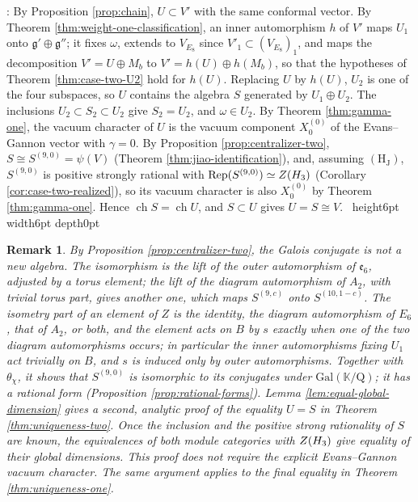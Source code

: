\documentclass[leqno]{article}
\newcommand{\K}{\ensuremath{\mathbb{K}}}
\newcommand{\Q}{\mathrm{Q}}
\let\cal\relax
\newcommand{\cal}{\mathcal}
\newcommand{\qed}{\hfill \vrule height6pt  width6pt depth0pt}
\DeclareMathOperator{\Rep}{Rep}
\newtheorem{remark}[thm]{Remark}
\newenvironment{proof}[1][]{\noindent {\it Proof #1} : }{\hbox{~}\qed
\smallskip
}
\numberwithin{equation}{section}
\begin{document}
\begin{proof}
By Proposition \ref{prop:chain}, $U \subset V'$ with the same conformal vector. By Theorem \ref{thm:weight-one-classification}, an inner automorphism $h$ of $V'$ maps $U_1$ onto $\mathfrak g' \oplus \mathfrak g''$; it fixes $\omega$, extends to $V_{E_8}$ since $V'_1 \subset (V_{E_8})_1$, and maps the decomposition $V' = U \oplus M_b$ to $V' = h(U) \oplus h(M_b)$, so that the hypotheses of Theorem \ref{thm:case-two-U2} hold for $h(U)$. Replacing $U$ by $h(U)$, $U_2$ is one of the four subspaces, so $U$ contains the algebra $S$ generated by $U_1 \oplus U_2$. The inclusions $U_2 \subset S_2 \subset U_2$ give $S_2 = U_2$, and $\omega \in U_2$. By Theorem \ref{thm:gamma-one}, the vacuum character of $U$ is the vacuum component $X^{(0)}_0$ of the Evans--Gannon vector with $\gamma = 0$. By Proposition \ref{prop:centralizer-two}, $S \cong S^{(9,0)} = \psi(V)$ (Theorem \ref{thm:jiao-identification}), and, assuming $\mathrm{(H_J)}$, $S^{(9,0)}$ is positive strongly rational with $\Rep(S^{(9,0)}) \simeq Z(\cal H_3)$ (Corollary \ref{cor:case-two-realized}), so its vacuum character is also $X^{(0)}_0$ by Theorem \ref{thm:gamma-one}. Hence $\operatorname{ch}S = \operatorname{ch}U$, and $S \subset U$ gives $U = S \cong V$.
\end{proof}

\begin{remark}\normalfont
\label{rem:twin}
By Proposition \ref{prop:centralizer-two}, the Galois conjugate is not a new algebra. The isomorphism is the lift of the outer automorphism of $\mathfrak e_6$, adjusted by a torus element; the lift of the diagram automorphism of $A_2$, with trivial torus part, gives another one, which maps $S^{(9,c)}$ onto $S^{(10,1-c)}$. The isometry part of an element of $Z$ is the identity, the diagram automorphism of $E_6$, that of $A_2$, or both, and the element acts on $B$ by $s$ exactly when one of the two diagram automorphisms occurs; in particular the inner automorphisms fixing $U_1$ act trivially on $B$, and $s$ is induced only by outer automorphisms. Together with $\theta_\chi$, it shows that $S^{(9,0)}$ is isomorphic to its conjugates under $\mathrm{Gal}(\K/\Q)$; it has a rational form (Proposition \ref{prop:rational-forms}). Lemma \ref{lem:equal-global-dimension} gives a second, analytic proof of the equality $U = S$ in Theorem \ref{thm:uniqueness-two}. Once the inclusion and the positive strong rationality of $S$ are known, the equivalences of both module categories with $Z(\cal H_3)$ give equality of their global dimensions. This proof does not require the explicit Evans--Gannon vacuum character. The same argument applies to the final equality in Theorem \ref{thm:uniqueness-one}.
\end{remark}
\end{document}
